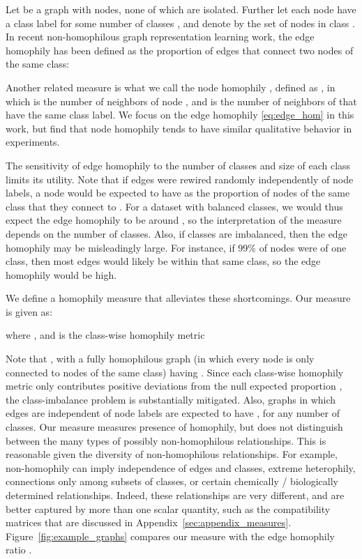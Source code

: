 \documentclass[sigconf, balance=false]{acmart}
\begin{document}
Let  be a graph with  nodes, none of which are isolated. Further let each node  have a class label  for some number of classes , and denote by  the set of nodes in class . In recent non-homophilous graph representation learning work, the edge homophily \cite{zhu2020beyond} has been defined as the proportion of edges that connect two nodes of the same class:

Another related measure is what we call the node homophily \cite{pei2019geom}, defined as
 , in which  is the number of neighbors of node , and  is the number of neighbors of  that have the same class label. We focus on the edge homophily \eqref{eq:edge_hom} in this work, but find that node homophily tends to have similar qualitative behavior in experiments. 
 
The sensitivity of edge homophily to the number of classes and size of each class limits its utility. Note that if edges were rewired randomly independently of node labels, a node  would be expected to have  as the proportion of nodes of the same class that they connect to \cite{altenburger2018monophily}. For a dataset with  balanced classes, we would thus expect the edge homophily to be around , so the interpretation of the measure depends on the number of classes. Also, if classes are imbalanced, then the edge homophily may be misleadingly large. For instance, if 99\% of nodes were of one class, then most edges would likely be within that same class, so the edge homophily would be high. 

We define a homophily measure that alleviates these shortcomings. Our measure is given as:

where , and  is the class-wise homophily metric


Note that , with a fully homophilous graph (in which every node is only connected to nodes of the same class) having . Since each class-wise homophily metric  only contributes positive deviations from the null expected proportion , the class-imbalance problem is substantially mitigated. Also, graphs in which edges are independent of node labels are expected to have , for any number of classes. Our measure  measures presence of homophily, but does not distinguish between the many types of possibly non-homophilous relationships. This is reasonable given the diversity of non-homophilous relationships. For example, non-homophily can imply independence of edges and classes, extreme heterophily, connections only among subsets of classes, or certain chemically / biologically determined relationships. Indeed, these relationships are very different, and are better captured by more than one scalar quantity, such as the compatibility matrices that are discussed in Appendix~\ref{sec:appendix_measures}. Figure~\ref{fig:example_graphs} compares our measure  with the edge homophily ratio .
\end{document}
